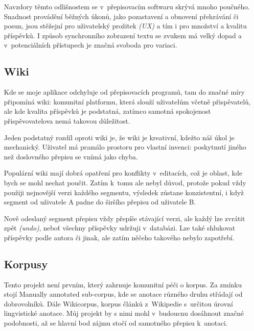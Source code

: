 \vspace{5mm}

Navzdory těmto odlišnostem se v~přepisovacím softwaru skrývá mnoho poučného.
Snadnost provádění běžných úkonů, jako pozastavení a obnovení přehrávání či
posun, jsou stěžejní pro uživatelský prožitek {\em (UX)} a tím i pro množství a kvalitu
příspěvků. I způsob synchronního zobrazení textu se zvukem má velký dopad a
v~potenciálních přístupech je značná svoboda pro variaci.

\subsection{Wiki}

Kde se moje aplikace odchyluje od přepisovacích programů, tam do značné
míry připomíná wiki: komunitní platformu, která slouží uživatelům včetně
přispěvatelů, ale kde kvalita příspěvků je podstatná, zatímco samotná
spokojenost přispěvovatelova nemá takovou důležitost.

Jeden podstatný rozdíl oproti wiki je, že wiki je kreativní, kdežto náš úkol je
mechanický. Uživatel má pramálo prostoru pro vlastní invenci: poskytnutí jiného
než doslovného přepisu se vnímá jako chyba.

Populární wiki mají dobrá opatření pro konflikty v~editacích, což je oblast, kde
bych se mohl nechat poučit. Zatím k~tomu ale nebyl důvod, protože pokud vždy
použiji nejnovější verzi každého segmentu, výsledek zůstane konzistentní, i když
segment od uživatele A padne do širšího přepisu od uživatele B.

Nově odeslaný segment přepisu vždy přepíše stávající verzi, ale každý lze
zvrátit zpět {\em (undo)}, neboť všechny příspěvky udržuji v~databázi. Lze také
shlukovat příspěvky podle autora či jinak, ale zatím něčeho takového nebylo
zapotřebí.

\subsection{Korpusy}
\label{ssec:setting-corpora}

Tento projekt není prvním, který zahrnuje komunitní péči o korpus. Za zmínku
stojí Manually annotated sub-corpus\cite{ide2010manually}, kde se anotace různého
druhu střádají od dobrovolníků. Dále Wikicorpus\cite{reese2010wikicorpus},
korpus článků z~Wikipedie s~určitou úrovní lingvistické anotace. Můj projekt
by s nimi mohl v~budoucnu dosáhnout značné podobnosti, až se hlavní bod zájmu
stočí od samotného přepisu k~anotaci.

